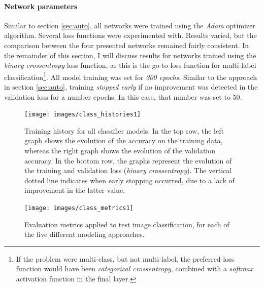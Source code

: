 \paragraph{Network parameters}
Similar to section \textcolor{blue}{\ref{sec:auto}}, all networks were trained using the \textit{Adam} optimizer algorithm. Several loss functions were experimented with. Results varied, but the comparison between the four presented networks remained fairly consistent. In the remainder of this section, I will discuss results for networks trained using the \textit{binary crossentropy} loss function, as this is the go-to loss function for multi-label classification\footnote{If the problem were multi-class, but not multi-label, the preferred loss function would have been \textit{categorical crossentropy}, combined with a \textit{softmax} activation function in the final layer.}. All model training was set for \textit{300 epochs}. Similar to the approach in section \textcolor{blue}{\ref{sec:auto}}, training \textit{stopped early} if no improvement was detected in the validation loss for a number epochs. In this case, that number was set to 50. 

\begin{figure}[!htbp]
	\begin{center}
		\texttt{[image: images/class\_histories1]}
		\caption{Training history for all classifier models. In the top row, the left graph shows the evolution of the accuracy on the training data, whereas the right graph shows the evolution of the validation accuracy. In the bottom row, the graphs represent the evolution of the training and validation loss (\textit{binary crossentropy}). The vertical dotted line indicates when early stopping occurred, due to a lack of improvement in the latter value.}
		\label{fig:class_histories1}
	\end{center}
\end{figure}

\begin{figure}[!htbp]
	\begin{center}
		\texttt{[image: images/class\_metrics1]}
		\caption{Evaluation metrics applied to test image classification, for each of the five different modeling approaches.}
		\label{fig:class_metrics1}
	\end{center}
\end{figure}

